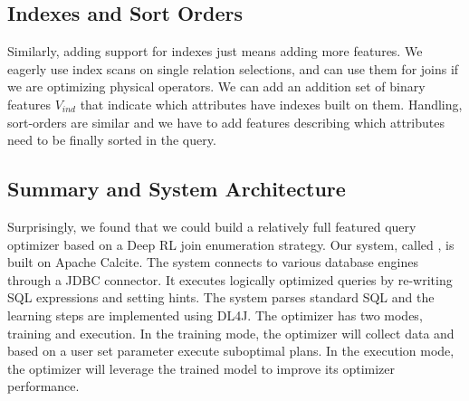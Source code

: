 \subsection*{Indexes and Sort Orders}
Similarly, adding support for indexes just means adding more features. We eagerly use index scans on single relation selections, and can use them for joins if we are optimizing physical operators. We can add an addition set of binary features $V_{ind}$ that indicate which attributes have indexes built on them. Handling, sort-orders are similar and we have to add features describing which attributes need to be finally sorted in the query.

\subsection*{Summary and System Architecture}
Surprisingly, we found that we could build a relatively full featured query optimizer based on a Deep RL join enumeration strategy.
Our system, called \qsys, is built on Apache Calcite.
The system connects to various database engines through a JDBC connector. It executes logically optimized queries by re-writing SQL expressions and setting hints.
The system parses standard SQL and the learning steps are implemented using \textsf{DL4J}.
The optimizer has two modes, training and execution. In the training mode, the optimizer will collect data and based on a user set parameter execute suboptimal plans. In the execution mode, the optimizer will leverage the trained model to improve its optimizer performance.

